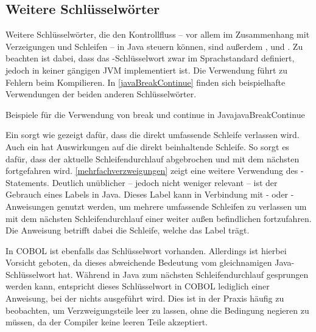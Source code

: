 \subsection{Weitere Schlüsselwörter}

Weitere Schlüsselwörter, die den Kontrollfluss -- vor allem im Zusammenhang mit Verzeigungen und Schleifen -- in Java steuern können, sind außerdem ,  und . Zu beachten ist dabei, dass das -Schlüsselwort zwar im Sprachstandard definiert, jedoch in keiner gängigen JVM implementiert ist. Die Verwendung führt zu Fehlern beim Kompilieren. In \autoref{javaBreakContinue} finden sich beispielhafte Verwendungen der beiden anderen Schlüsselwörter.

\begin{codeWithCaption}{Beispiele für die Verwendung von break und continue in Java}{javaBreakContinue}
 \cFollow
{}
\end{codeWithCaption}

Ein  sorgt wie gezeigt dafür, dass die direkt umfassende Schleife verlassen wird. Auch ein  hat Auswirkungen auf die direkt beinhaltende Schleife. So sorgt es dafür, dass der aktuelle Schleifendurchlauf abgebrochen und mit dem nächsten fortgefahren wird. \autoref{mehrfachverzweigungen} zeigt eine weitere Verwendung des -Statements. Deutlich unüblicher -- jedoch nicht weniger relevant -- ist der Gebrauch eines Labels in Java. Dieses Label kann in Verbindung mit - oder -Anweisungen genutzt werden, um mehrere umfassende Schleifen zu verlassen \bzw um mit dem nächsten Schleifendurchlauf einer weiter außen befindlichen fortzufahren. Die Anweisung betrifft dabei die Schleife, welche das Label trägt. 

In COBOL ist ebenfalls das Schlüsselwort  vorhanden. Allerdings ist hierbei Vorsicht geboten, da dieses abweichende Bedeutung vom gleichnamigen Java-Schlüsselwort hat. Während in Java zum nächsten Schleifendurchlauf gesprungen werden kann, entspricht dieses Schlüsselwort in COBOL lediglich einer Anweisung, bei der nichts ausgeführt wird. Dies ist in der Praxis häufig zu beobachten, um \zB Verzweigungsteile leer zu lassen, ohne die Bedingung negieren zu müssen, da der Compiler keine leeren Teile akzeptiert.

